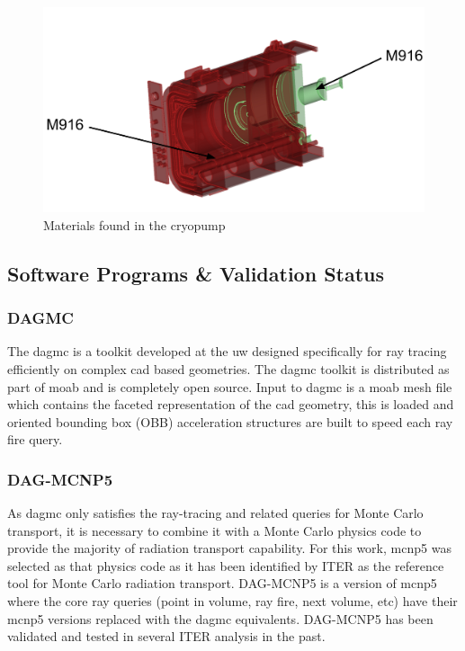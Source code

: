 \documentclass[12pt]{article}
\begin{document}
\begin{figure}[p]
  \centering
  \includegraphics[scale=0.32]{../plots/cad/mats/label_6.png}
  \caption{Materials found in the cryopump}
  \label{fig:material_assign_5}
\end{figure}

\newpage
\clearpage
\subsection{Software Programs \& Validation Status}
\subsubsection{DAGMC}
The \gls{dagmc} is a toolkit developed at the \gls{uw}
designed specifically for ray tracing efficiently on complex \gls{cad} based
geometries. The \gls{dagmc} toolkit is distributed as part of \gls{moab} and
is completely open source. Input to \gls{dagmc} is a \gls{moab} mesh file
which contains the faceted representation of the \gls{cad} geometry, this
is loaded and oriented bounding box (OBB) acceleration structures are built
to speed each ray fire query.

\subsubsection{DAG-MCNP5}
As \gls{dagmc} only satisfies the ray-tracing 
and related queries for Monte Carlo transport, it is necessary to combine it
with a Monte Carlo physics code to provide the majority of radiation transport
capability. For this work, \gls{mcnp5} \cite{mcnp} was selected as that physics
code as it has been identified by ITER as the reference tool for Monte Carlo 
radiation transport.  DAG-MCNP5 \cite{dagmc} is a version of \gls{mcnp5} where the core ray
queries (point in volume, ray fire, next volume, etc) have their \gls{mcnp5}
versions replaced with the \gls{dagmc} equivalents. DAG-MCNP5 has been validated
\cite{dagmc_validation} and tested in several ITER analysis in the past.
\end{document}
